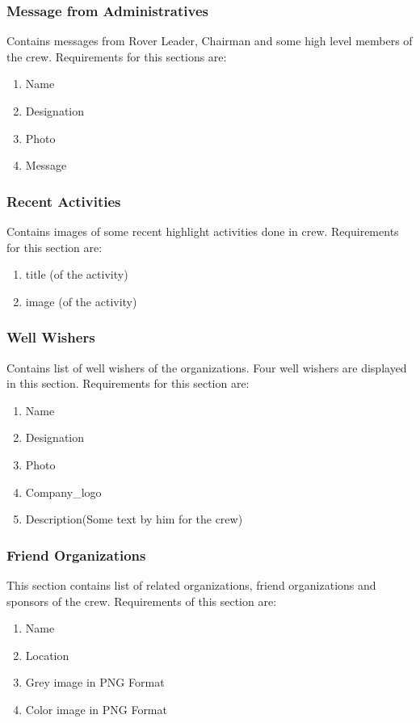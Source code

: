 			\subsubsection{Message from Administratives}
				Contains messages from Rover Leader, Chairman and some high level members of the crew. Requirements for this sections are:
				\begin{enumerate}
					\item Name
					\item Designation
					\item Photo
					\item Message
				\end{enumerate}
			\subsubsection{Recent Activities}
				Contains images of some recent highlight activities done in crew. Requirements for this section are:
				\begin{enumerate}
					\item title (of the activity)
					\item image (of the activity)
				\end{enumerate}
			\subsubsection{Well Wishers}
				Contains list of well wishers of the organizations. Four well wishers are displayed in this section. Requirements for this section are:
				\begin{enumerate}
					\item Name
					\item Designation
					\item Photo
					\item Company\_logo
					\item Description(Some text by him for the crew)
				\end{enumerate}
			\subsubsection{Friend Organizations}
				This section contains list of related organizations, friend organizations and sponsors of the crew. Requirements of this section are:
				\begin{enumerate}
					\item Name
					\item Location
					\item Grey image in PNG Format
					\item Color image in PNG Format
				\end{enumerate}
